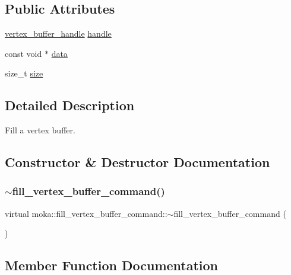 \subsection*{Public Attributes}
\begin{DoxyCompactItemize}
\item 
\mbox{\hyperlink{structmoka_1_1vertex__buffer__handle}{vertex\+\_\+buffer\+\_\+handle}} \mbox{\hyperlink{classmoka_1_1fill__vertex__buffer__command_abcd9d3ffd197da205234e7d8a6029224}{handle}}
\item 
const void $\ast$ \mbox{\hyperlink{classmoka_1_1fill__vertex__buffer__command_a7e10e74586aa6b3584162d10d0f3d58e}{data}}
\item 
size\+\_\+t \mbox{\hyperlink{classmoka_1_1fill__vertex__buffer__command_acae9b5478cb4c11d7206d82d94246aa3}{size}}
\end{DoxyCompactItemize}


\subsection{Detailed Description}
Fill a vertex buffer. 

\subsection{Constructor \& Destructor Documentation}
\mbox{\label{classmoka_1_1fill__vertex__buffer__command_a6ebbeb058ca33317cb889a5dbbf08254}} 
\subsubsection{\texorpdfstring{$\sim$fill\_vertex\_buffer\_command()}{~fill\_vertex\_buffer\_command()}}
{\footnotesize\ttfamily virtual moka\+::fill\+\_\+vertex\+\_\+buffer\+\_\+command\+::$\sim$fill\+\_\+vertex\+\_\+buffer\+\_\+command (\begin{DoxyParamCaption}{ }\end{DoxyParamCaption})\hspace{0.3cm}{\ttfamily [virtual]}}



\subsection{Member Function Documentation}
\mbox{\label{classmoka_1_1fill__vertex__buffer__command_a9e916e2371a2a165e1450f635dd534a9}} 
